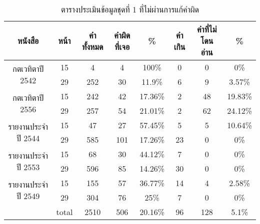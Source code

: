 \begin{table}[H]
    \caption{ตารางประเมินข้อมูลชุดที่ 1 ที่ไม่ผ่านการแก้คำผิด}\label{tbl:correction}
    \begin{tabular}{|c|c|c|c|c|c|c|c|}
        \hline
        หนังสือ                             & หน้า                       & คำทั้งหมด & คำผิดที่เจอ & \%    & คำเกิน & คำที่ไม่โดนอ่าน & \%    \\ \hline
        \multirow{2}{*}{กตเวทิตาปี 2542}    & 15                         & 4         & 4           & 100\%   & 0      & 0               & 0\%     \\ \cline{2-8} 
                                            & 29                         & 252       & 30          & 11.9\%  & 6      & 9               & 3.57\%  \\ \hline
        \multirow{2}{*}{กตเวทิตาปี 2556}    & 15                         & 242       & 42          & 17.36\% & 2      & 48              & 19.83\% \\ \cline{2-8} 
                                            & 29                         & 257       & 54          & 21.01\% & 2      & 62              & 24.12\% \\ \hline
        \multirow{2}{*}{รายงานประจำปี 2544} & 15                         & 47        & 27          & 57.45\% & 5      & 5               & 10.64\% \\ \cline{2-8} 
                                            & 29                         & 585       & 101         & 17.26\% & 23     & 0               & 0\%     \\ \hline
        \multirow{2}{*}{รายงานประจำปี 2553} & 15                         & 68        & 30          & 44.12\% & 7      & 0               & 0\%     \\ \cline{2-8} 
                                            & 29                         & 596       & 85          & 14.26\% & 30     & 0               & 0\%     \\ \hline
        \multirow{2}{*}{รายงานประจำปี 2549} & 15                         & 155       & 57          & 36.77\% & 14     & 4               & 2.58\%  \\ \cline{2-8} 
                                            & 29                         & 304       & 76          & 25\%    & 7      & 0               & 0\%     \\ \hline
        \multicolumn{1}{|l|}{}              & \multicolumn{1}{l|}{total} & 2510      & 506         & 20.16\% & 96     & 128             & 5.1\%   \\ \hline
        \end{tabular}
        \end{table}

